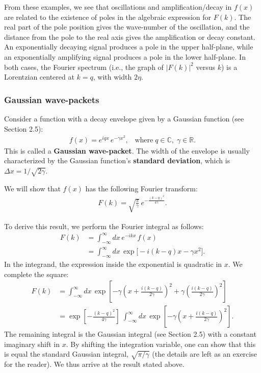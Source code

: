 \documentclass[10pt,a4paper]{article}
\begin{document}
From these examples, we see that oscillations and amplification/decay
in $f(x)$ are related to the existence of poles in the algebraic
expression for $F(k)$. The real part of the pole position gives the
wave-number of the oscillation, and the distance from the pole to the
real axis gives the amplification or decay constant.  An exponentially
decaying signal produces a pole in the upper half-plane, while an
exponentially amplifying signal produces a pole in the lower
half-plane. In both cases, the Fourier spectrum (i.e., the graph of
$|F(k)|^2$ versus $k$) is a Lorentzian centered at $k = q$, with width
$2\eta$.

\subsubsection{Gaussian wave-packets}
\label{gaussian-wave-packets}

Consider a function with a decay envelope given by a Gaussian function
(see Section 2.5):
\begin{align}
  f(x) = e^{iq x} \, e^{-\gamma x^2}, \;\;\;\mathrm{where}\; q \in \mathbb{C},\; \gamma \in \mathbb{R}.
\end{align}
This is called a \textbf{Gaussian wave-packet}. The width of the
envelope is usually characterized by the Gaussian function's
\textbf{standard deviation}, which is $\Delta x = 1/\sqrt{2\gamma}$.

We will show that $f(x)$ has the following Fourier transform:
\begin{align}
  F(k) = \sqrt{\frac{\pi}{\gamma}} \, e^{-\frac{(k-q)^2}{4\gamma}}.
\end{align}

To derive this result, we perform the Fourier integral as follows:
\begin{align}
  F(k) &= \int_{-\infty}^\infty dx \, e^{-ikx}\, f(x) \\
  &= \int_{-\infty}^\infty dx \, \exp\big[-i(k-q)x -\gamma x^2\big].
\end{align}
In the integrand, the expression inside the exponential is quadratic
in $x$.  We complete the square:
\begin{align}
  F(k) &= \int_{-\infty}^\infty dx \, \exp\left[-\gamma\left(x + \frac{i(k-q)}{2\gamma}\right)^2 + \gamma\left(\frac{i(k-q)}{2\gamma}\right)^2\right] \\
  &= \exp\left[ - \frac{(k-q)^2}{4\gamma}\right]\; \int_{-\infty}^\infty dx \, \exp\left[-\gamma\left(x + \frac{i(k-q)}{2\gamma}\right)^2\right].
 \end{align}
The remaining integral is the Gaussian integral (see Section 2.5) with
a constant imaginary shift in $x$. By shifting the integration
variable, one can show that this is equal the standard Gaussian
integral, $\sqrt{\pi/\gamma}$ (the details are left as an exercise for
the reader).  We thus arrive at the result stated above.
\end{document}
